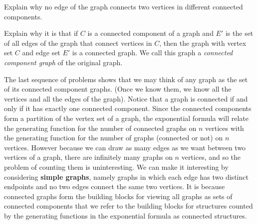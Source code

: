 \itemes Explain why no edge of the graph connects two vertices in
different connected components.

\itemes  Explain why it is that if $C$ is a connected component of a
graph and
$E'$ is the set of all edges of the graph that connect vertices in $C$,
then the graph with vertex set $C$ and edge set
$E'$ is a connected graph.  We call this graph a {\em connected component
graph} of the original graph.

\ep
The last sequence of problems shows that we may think of any graph as the
set of its connected component graphs.  (Once we know them, we  know all
the vertices and all the edges of the graph).  Notice that a graph is
connected if and only if it has exactly one connected component.  Since
the connected components form a partition of the vertex set of a graph,
the exponential formula will relate the generating function for the
number of connected graphs on $n$ vertices with the generating function
for the number of graphs (connected or not) on $n$ vertices. However
because we can draw as many edges as we want between two vertices of a
graph, there are infinitely many graphs on $n$ vertices, and so the
problem of counting them is uninteresting.  We can make it interesting by
considering {\bf simple graphs},
namely graphs in which each edge has two distinct endpoints and no two
edges connect the same two vertices. It is because connected graphs form
the building blocks for viewing all graphs as sets of connected components
that we refer to the building blocks for structures counted by the
generating functions in the exponential formula as connected
structures.

